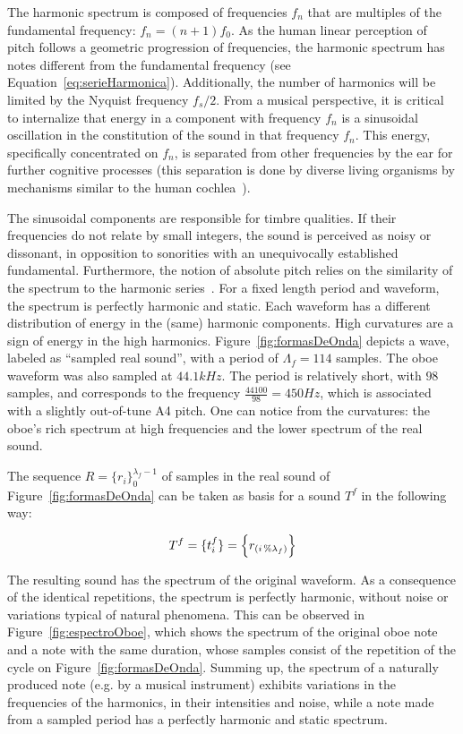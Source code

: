 The harmonic spectrum is composed of frequencies $f_n$ that are multiples of the fundamental frequency: $f_n=(n+1)f_0$. As the human linear perception of pitch follows a geometric progression of frequencies, the harmonic spectrum has notes different from the fundamental frequency (see Equation~\ref{eq:serieHarmonica}). Additionally, the number of harmonics will be limited by the Nyquist frequency $f_s/2$. From a musical perspective, it is critical to internalize that energy in a component with frequency $f_n$ is a sinusoidal oscillation in the constitution of the sound in that frequency $f_n$. This energy, specifically concentrated on $f_n$, is separated from other frequencies by the ear for further cognitive processes (this separation is done by diverse living organisms by mechanisms similar to the human cochlea~\cite{Roederer}).

The sinusoidal components are responsible for timbre qualities. If their frequencies do not relate by small integers, the sound is perceived as noisy or dissonant, in opposition to sonorities with an unequivocally established fundamental. Furthermore, the notion of absolute pitch relies on the similarity of the spectrum to the harmonic series~\cite{Roederer}. For a fixed length period and waveform, the spectrum is perfectly harmonic and static. Each waveform has a different distribution of energy in the (same) harmonic components. High curvatures are a sign of energy in the high harmonics. Figure~\ref{fig:formasDeOnda} depicts a wave, labeled as ``sampled real sound'', with a period of $\Lambda_f=114$ samples. The oboe waveform was also sampled at $44.1kHz$. The period is relatively short, with $98$ samples, and corresponds to the frequency $\frac{44100}{98}=450Hz$, which is associated with a slightly out-of-tune A4 pitch. One can notice from the curvatures: the oboe's rich spectrum at high frequencies and the lower spectrum of the real sound.

The sequence $R=\{ r_i \}_0^{\lambda_f-1}$ of samples in the real sound of Figure~\ref{fig:formasDeOnda} can be taken as basis for a sound $T^f$ in the following way:

\begin{equation}\label{sampleandoFormaDeOnda}
     T^f=\{ t_i^f \}=\Bigl\{ r_{(i\,\%\lambda_{f})} \Bigr\}
\end{equation}

The resulting sound has the spectrum of the original waveform. As a consequence of the identical repetitions, the spectrum is perfectly harmonic, without noise or variations typical of natural phenomena. This can be observed in Figure~\ref{fig:espectroOboe}, which shows the spectrum of the original oboe note and a note with the same duration, whose samples consist of the repetition of the cycle on Figure~\ref{fig:formasDeOnda}. Summing up, the spectrum of a naturally produced note (e.g. by a musical instrument) exhibits variations in the frequencies of the harmonics, in their intensities and noise, while a note made from a sampled period has a perfectly harmonic and static spectrum.

